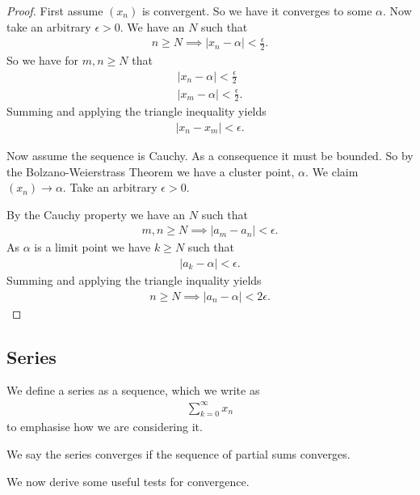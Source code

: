 \documentclass[]{article}
\begin{document}
\begin{proof}
		First assume $(x_n)$ is convergent. So we have it converges to some $\alpha$. Now take an arbitrary $\epsilon > 0$. We have an $N$ such that
		\begin{align*}
				n \geq N \implies |x_n - \alpha| < \frac{\epsilon}{2}.
		\end{align*}
		So we have for $m,n \geq N$ that
		\begin{align*}
				|x_n - \alpha| < \frac{\epsilon}{2} \\
				|x_m - \alpha| < \frac{\epsilon}{2}.
		\end{align*}
		Summing and applying the triangle inequality yields 
		\begin{align*}
				|x_n - x_m| < \epsilon.
		\end{align*}

		Now assume the sequence is Cauchy. As a consequence it must be bounded. So by the Bolzano-Weierstrass Theorem we have a cluster point, $\alpha$. We claim $(x_n) \to \alpha$. Take an arbitrary $\epsilon > 0$. 

		By the Cauchy property we have an $N$ such that
		\begin{align*}
			m,n \geq N \implies |a_m - a_n| < \epsilon.
		\end{align*}
		As $\alpha $ is a limit point we have $k \geq N$ such that
		\begin{align*}
				|a_k - \alpha| < \epsilon.
		\end{align*}
		Summing and applying the triangle inquality yields 
		\begin{align*}
				n \geq N \implies |a_n - \alpha| < 2\epsilon.
		\end{align*}
\end{proof}

\subsection{Series}

\begin{defi} [Series]
	We define a series as a sequence, which we write as
	\begin{align*}
			\sum_{k=0}^\infty x_n
	\end{align*}
	to emphasise how we are considering it.

	We say the series converges if the sequence of partial sums converges.
\end{defi}

We now derive some useful tests for convergence.
\end{document}
